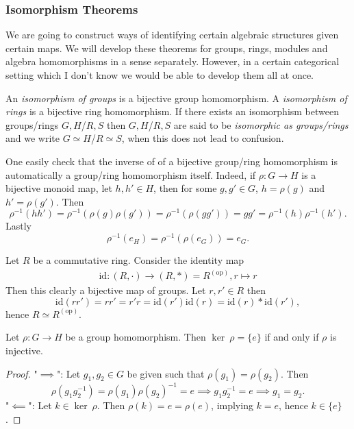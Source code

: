     \subsubsection{Isomorphism Theorems}
    We are going to construct ways of identifying certain algebraic structures given certain maps. We will develop these theorems for groups, rings, modules and algebra homomorphisms in a sense separately. However, in a certain categorical setting {\Large which I don't know} we would be able to develop them all at once.   
\begin{definition}
    An \textit{isomorphism of groups} is a bijective group homomorphism. A \textit{isomorphism of rings} is a bijective ring homomorphism. If there exists an isomorphism between groups/rings $G,H$/$R,S$ then $G,H$/$R,S$ are said to be \textit{isomorphic as groups/rings} and we write $G\simeq H$/$R\simeq S$, when this does not lead to confusion.   
\end{definition}
\begin{remark}
    One easily check that the inverse of of a bijective group/ring homomorphism is automatically a group/ring homomorphism itself. Indeed, if $\rho: G\rightarrow H$ is a bijective monoid map, let $h,h'\in H$, then for some $g,g'\in G$, $h=\rho(g)$ and $h' = \rho(g')$. Then 
    $$\rho^{-1}(hh')=\rho^{-1}(\rho(g)\rho(g'))=\rho^{-1}(\rho(gg'))=gg'=\rho^{-1}(h)\rho^{-1}(h').$$
    Lastly 
    $$\rho^{-1}(e_H) = \rho^{-1}(\rho(e_G))= e_G.$$
\end{remark}
\begin{example}
    Let $R$ be a commutative ring. Consider the identity map
    \begin{gather*}
        \text{id} : (R,\cdot) \rightarrow (R,\ast)= R^{(\text{op})},
        r \mapsto r
    \end{gather*}
    Then this clearly a bijective map of groups. Let $r,r'\in R$ then 
    $$\text{id}(rr') = rr' = r'r = \text{id}(r')\text{id}(r) = \text{id}(r)\ast \text{id}(r'),$$
    hence $R\simeq R^{(\text{op})}$.
\end{example}
\begin{lemma}\label{KernelIsZerosIffInjective}
    Let $\rho : G \rightarrow H$ be a group homomorphism. Then $\ker \ \rho = \{e\}$ if and only if $\rho$ is injective.
\end{lemma}
\begin{proof}
    "$\implies$": Let $g_1,g_2 \in G$ be given such that $\rho(g_1)=\rho(g_2)$. Then
    $$\rho\left(g_1g_2^{-1}\right)=\rho(g_1)\rho(g_2)^{-1} = e \implies g_1g_2^{-1} = e \implies g_1 = g_2.$$
    "$\impliedby$": Let $k\in \ker \ \rho$. Then $\rho(k) = e = \rho(e)$, implying $k=e$, hence $k\in \{e\}$.
\end{proof}
